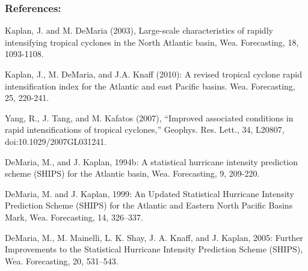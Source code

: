 \documentclass[11pt]{article}
\begin{document}
\hypertarget{references}{%
\subsubsection{References:}\label{references}}

Kaplan, J. and M. DeMaria (2003), Large-scale characteristics of rapidly
intensifying tropical cyclones in the North Atlantic basin, Wea.
Forecasting, 18, 1093-1108.

Kaplan, J., M. DeMaria, and J.A. Knaff (2010): A revised tropical
cyclone rapid intensification index for the Atlantic and east Pacific
basins. Wea. Forecasting, 25, 220-241.

Yang, R., J. Tang, and M. Kafatos (2007), ``Improved associated
conditions in rapid intensifications of tropical cyclones,'' Geophys.
Res. Lett., 34, L20807, doi:10.1029/2007GL031241.

DeMaria, M., and J. Kaplan, 1994b: A statistical hurricane intensity
prediction scheme (SHIPS) for the Atlantic basin, Wea. Forecasting, 9,
209-220.

DeMaria, M. and J. Kaplan, 1999: An Updated Statistical Hurricane
Intensity Prediction Scheme (SHIPS) for the Atlantic and Eastern North
Pacific Basins Mark, Wea. Forecasting, 14, 326--337.

DeMaria, M., M. Mainelli, L. K. Shay, J. A. Knaff, and J. Kaplan, 2005:
Further Improvements to the Statistical Hurricane Intensity Prediction
Scheme (SHIPS), Wea. Forecasting, 20, 531--543.

\vskip 0.2in


    
    
    
    
\end{document}

